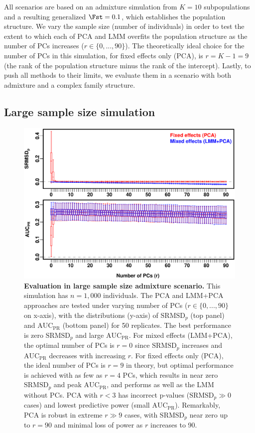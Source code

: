 \documentclass[11pt]{article}
\newcommand{\rmsd}{\text{SRMSD}_p}
\newcommand{\auc}{\text{AUC}_\text{PR}}
\begin{document}
All scenarios are based on an admixture simulation from $K=10$ subpopulations and a resulting generalized $\Fst = 0.1$, which establishes the population structure.
We vary the sample size (number of individuals) in order to test the extent to which each of PCA and LMM overfits the population structure as the number of PCs increases ($r \in \{0, ..., 90\}$).
The theoretically ideal choice for the number of PCs in this simulation, for fixed effects only (PCA), is $r = K-1 = 9$ (the rank of the population structure minus the rank of the intercept).
Lastly, to push all methods to their limits, we evaluate them in a scenario with both admixture and a complex family structure.

\subsection{Large sample size simulation}

\begin{figure}[bp!]
  \centering
  \includegraphics[width=6in]{../data/sim-n1000-k10-f0.1-s0.5-g1/sum-rmsd-auc.pdf}
  \caption{
    {\bf Evaluation in large sample size admixture scenario.}
    This simulation has $n = 1,000$ individuals.
    The PCA and LMM+PCA approaches are tested under varying number of PCs ($r \in \{0, ..., 90\}$ on x-axis), with the distributions (y-axis) of $\rmsd$ (top panel) and $\auc$ (bottom panel) for 50 replicates.
    The best performance is zero $\rmsd$ and large $\auc$.
    For mixed effects (LMM+PCA), the optimal number of PCs is $r=0$ since $\rmsd$ increases and $\auc$ decreases with increasing $r$.
    For fixed effects only (PCA), the ideal number of PCs is $r = 9$ in theory, but optimal performance is achieved with as few as $r = 4$ PCs, which results in near zero $\rmsd$ and peak $\auc$, and performs as well as the LMM without PCs.
    PCA with $r < 3$ has incorrect p-values ($\rmsd \gg 0$ cases) and lowest predictive power (small $\auc$).
    Remarkably, PCA is robust in extreme $r \gg 9$ cases, with $\rmsd$ near zero up to $r = 90$ and minimal loss of power as $r$ increases to 90.
  }
  \label{fig:large_sample_size}
\end{figure}
\end{document}
